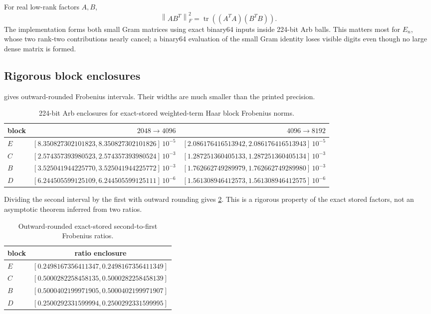 \documentclass[11pt]{article}
\theoremstyle{definition}
\theoremstyle{remark}
\newcommand{\norm}[1]{\left\lVert #1\right\rVert}
\begin{document}
For real low-rank factors $A,B$,
\begin{equation}
 \norm{AB^T}_F^2
 =\operatorname{tr}\!\left((A^TA)(B^TB)\right).
 \label{eq:low-rank-frobenius}
\end{equation}
The implementation forms both small Gram matrices using exact binary64
inputs inside 224-bit Arb balls.  This matters most for $E_n$, whose two
rank-two contributions nearly cancel; a binary64 evaluation of the small
Gram identity loses visible digits even though no large dense matrix is
formed.

\subsection{Rigorous block enclosures}

 gives outward-rounded Frobenius intervals.  Their
widths are much smaller than the printed precision.

\begin{table}[H]
\centering
\small
\setlength{\tabcolsep}{4pt}
\caption{224-bit Arb enclosures for exact-stored weighted-term Haar block
Frobenius norms.}
\label{tab:block-enclosures}
\begin{tabular}{lrr}
\toprule
block & $2048\to4096$ & $4096\to8192$\\
\midrule
$E$ & $[8.350827302101823,8.350827302101826]\,10^{-5}$
    & $[2.086176416513942,2.086176416513943]\,10^{-5}$\\
$C$ & $[2.574357393980523,2.574357393980524]\,10^{-3}$
    & $[1.287251360405133,1.287251360405134]\,10^{-3}$\\
$B$ & $[3.525041944225770,3.525041944225772]\,10^{-3}$
    & $[1.762662749289979,1.762662749289980]\,10^{-3}$\\
$D$ & $[6.244505599125109,6.244505599125111]\,10^{-6}$
    & $[1.561308946412573,1.561308946412575]\,10^{-6}$\\
\bottomrule
\end{tabular}
\end{table}

Dividing the second interval by the first with outward rounding gives
\cref{tab:ratios}.  This is a rigorous property of the exact stored factors,
not an asymptotic theorem inferred from two ratios.

\begin{table}[H]
\centering
\caption{Outward-rounded exact-stored second-to-first Frobenius ratios.}
\label{tab:ratios}
\begin{tabular}{lc}
\toprule
block & ratio enclosure\\
\midrule
$E$ & $[0.2498167356411347,0.2498167356411349]$\\
$C$ & $[0.5000282258458135,0.5000282258458139]$\\
$B$ & $[0.5000402199971905,0.5000402199971907]$\\
$D$ & $[0.2500292331599994,0.2500292331599995]$\\
\bottomrule
\end{tabular}
\end{table}
\end{document}
